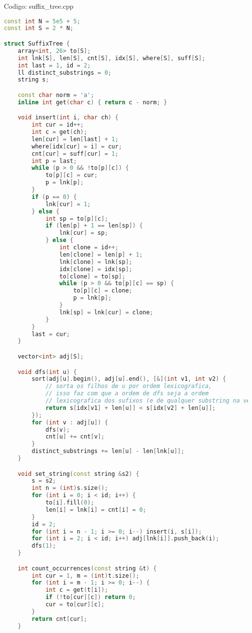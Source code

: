 \documentclass[10pt, a4paper, oneside]{book}
\begin{document}
Codigo: suffix\_tree.cpp

\begin{lstlisting}[language=C++]
const int N = 5e5 + 5;
const int S = 2 * N;

struct SuffixTree {
    array<int, 26> to[S];
    int lnk[S], len[S], cnt[S], idx[S], where[S], suff[S];
    int last = 1, id = 2;
    ll distinct_substrings = 0;
    string s;

    const char norm = 'a';
    inline int get(char c) { return c - norm; }

    void insert(int i, char ch) {
        int cur = id++;
        int c = get(ch);
        len[cur] = len[last] + 1;
        where[idx[cur] = i] = cur;
        cnt[cur] = suff[cur] = 1;
        int p = last;
        while (p > 0 && !to[p][c]) {
            to[p][c] = cur;
            p = lnk[p];
        }
        if (p == 0) {
            lnk[cur] = 1;
        } else {
            int sp = to[p][c];
            if (len[p] + 1 == len[sp]) {
                lnk[cur] = sp;
            } else {
                int clone = id++;
                len[clone] = len[p] + 1;
                lnk[clone] = lnk[sp];
                idx[clone] = idx[sp];
                to[clone] = to[sp];
                while (p > 0 && to[p][c] == sp) {
                    to[p][c] = clone;
                    p = lnk[p];
                }
                lnk[sp] = lnk[cur] = clone;
            }
        }
        last = cur;
    }

    vector<int> adj[S];

    void dfs(int u) {
        sort(adj[u].begin(), adj[u].end(), [&](int v1, int v2) {
            // sorta os filhos de u por ordem lexicografica,
            // isso faz com que a ordem de dfs seja a ordem
            // lexicografica dos sufixos (e de qualquer substring na verdade)
            return s[idx[v1] + len[u]] < s[idx[v2] + len[u]];
        });
        for (int v : adj[u]) {
            dfs(v);
            cnt[u] += cnt[v];
        }
        distinct_substrings += len[u] - len[lnk[u]];
    }

    void set_string(const string &s2) {
        s = s2;
        int n = (int)s.size();
        for (int i = 0; i < id; i++) {
            to[i].fill(0);
            len[i] = lnk[i] = cnt[i] = 0;
        }
        id = 2;
        for (int i = n - 1; i >= 0; i--) insert(i, s[i]);
        for (int i = 2; i < id; i++) adj[lnk[i]].push_back(i);
        dfs(1);
    }

    int count_occurrences(const string &t) {
        int cur = 1, m = (int)t.size();
        for (int i = m - 1; i >= 0; i--) {
            int c = get(t[i]);
            if (!to[cur][c]) return 0;
            cur = to[cur][c];
        }
        return cnt[cur];
    }


\end{lstlisting}
\end{document}
